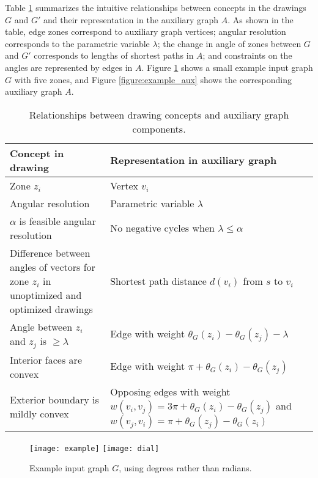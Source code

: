 \documentclass[11pt,letter]{article}
\begin{document}
Table \ref{table:relationships} summarizes the intuitive relationships between concepts in the drawings $G$ and $G'$ and their representation in the auxiliary graph $A$.  As shown in the table, edge zones correspond to auxiliary graph vertices; angular resolution corresponds to the parametric variable $\lambda$; the change in angle of zones between $G$ and $G'$ corresponds to lengths of shortest paths in $A$; and constraints on the angles are represented by edges in $A$.  Figure \ref{figure:example_input} shows a small example input graph $G$ with five zones, and Figure \ref{figure:example_aux} shows the corresponding auxiliary graph $A$.

\begin{table}
\centering
\begin{tabular}{|p{3in}|p{3in}|}
\hline
\bf{Concept in drawing} & \bf{Representation in auxiliary graph} \\ \hline \hline
Zone $z_i$ & Vertex $v_i$ \\ \hline
Angular resolution & Parametric variable $\lambda$ \\ \hline
$\alpha$ is feasible angular resolution & No negative cycles when $\lambda \leq \alpha$ \\ \hline
Difference between angles of vectors for zone $z_i$ in unoptimized and optimized drawings & Shortest path distance $d(v_i)$ from $s$ to $v_i$ \\ \hline
Angle between $z_i$ and $z_j$ is $\geq \lambda$ & Edge with weight $\theta_G(z_i)-\theta_G(z_j)-\lambda$ \\ \hline
Interior faces are convex & Edge with weight $\pi + \theta_G(z_i)-\theta_G(z_j)$ \\ \hline
Exterior boundary is mildly convex & Opposing edges with weight  $w(v_i,v_j)= 3\pi + \theta_G(z_i) - \theta_G(z_j)$ and $w(v_j,v_i)=\pi+\theta_G(z_j)-\theta_G(z_i)$ \\ \hline
\end{tabular}
\caption{Relationships between drawing concepts and auxiliary graph components.}
\label{table:relationships}
\end{table}

\begin{figure}[t]
\centering
\vspace{.5in}
\texttt{[image: example]} \hspace{.5in} \texttt{[image: dial]}
\caption{Example input graph $G$, using degrees rather than radians.}
\label{figure:example_input}
\end{figure}
\end{document}
